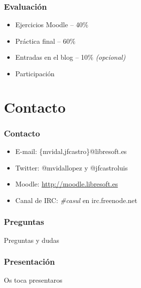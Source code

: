 \documentclass{beamer}
\begin{document}
\begin{frame}
  \frametitle{Evaluación}
  \begin{itemize}
    \item Ejercicios Moodle -- 40\%
    \item Práctica final -- 60\%
    \item Entradas en el blog -- 10\% \textit{(opcional)}
    \item Participación
  \end{itemize}
\end{frame}


\section{Contacto}
\begin{frame}
  \frametitle{Contacto}
  \begin{itemize}
    \item E-mail: \{mvidal,jfcastro\}@libresoft.es
    \item Twitter: @mvidallopez y @jfcastroluis
    \item Moodle: \url{http://moodle.libresoft.es}
    \item Canal de IRC: \textit{\#casul} en irc.freenode.net
  \end{itemize}
\end{frame}

\begin{frame}
  \frametitle{Preguntas}
  \begin{center}
    \huge{Preguntas y dudas}
  \end{center}
\end{frame}

\begin{frame}
  \frametitle{Presentación}
  \begin{center}
    \huge{Os toca presentaros}
  \end{center}
\end{frame}

\end{document}

